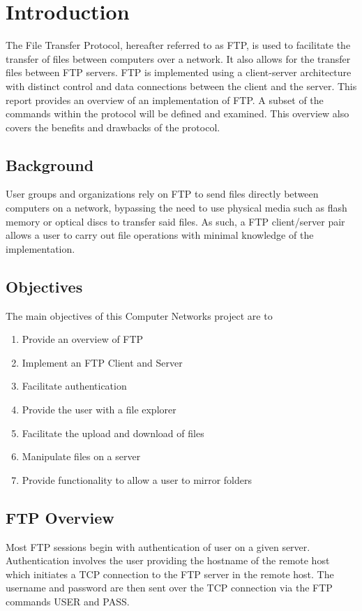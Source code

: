 \chapter{Introduction}
The File Transfer Protocol, hereafter referred to as FTP, is used to
facilitate the transfer of files between computers over a network. It also
allows for the transfer files between FTP servers.
FTP is implemented using a client-server architecture with distinct control
and data connections between the client and the server. This report provides an
overview of an implementation of FTP. A subset of the commands within the protocol
will be defined and examined. This overview also covers the benefits and drawbacks
of the protocol.


\section{Background}
User groups and organizations rely on FTP to send files directly between computers on a network,
bypassing the need to use physical media such as flash memory or optical discs to transfer said files.
As such, a FTP client/server pair allows a user to carry out file operations with minimal knowledge of the implementation.

\newpage

\section{Objectives}
The main objectives of this Computer Networks project are to
\begin{enumerate}
  \item Provide an overview of FTP
  \item Implement an FTP Client and Server
  \item Facilitate authentication
  \item Provide the user with a file explorer
  \item Facilitate the upload and download of files
  \item Manipulate files on a server
  \item Provide functionality to allow a user to mirror folders
\end{enumerate}

\section{FTP Overview}
Most FTP sessions begin with authentication of user on a given server. Authentication involves the user providing the hostname of the remote host which initiates a TCP
connection to the FTP server in the remote host. The username and password are then sent over the TCP connection via the FTP commands USER and PASS. \par

